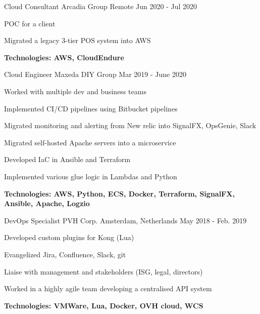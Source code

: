\begin{cventries}
\begin{minipage}{\dimexpr\textwidth-1cm}
\begin{cventrystack}
	\cventry
	{Cloud Consultant} %
	{Arcadia Group} %
	{Remote} %
	{Jun 2020 - Jul 2020} %
	{ %
		\begin{cvitems}
			\item {POC for a client}
			\item {Migrated a legacy 3-tier POS system into AWS}
			\item {\bfseries{Technologies:} AWS, CloudEndure}
		\end{cvitems}
	}

	\cventry
	{Cloud Engineer} %
	{Maxeda DIY Group} %
	{} %
	{Mar 2019 - June 2020} %
	{ %
		\begin{cvitems}
			\item {Worked with multiple dev and business teams}
			\item {Implemented CI/CD pipelines using Bitbucket pipelines}
			\item {Migrated monitoring and alerting from New relic into SignalFX, OpsGenie, Slack}
			\item {Migrated self-hosted Apache servers into a microservice}
			\item {Developed IaC in Ansible and Terraform}
			\item {Implemented various glue logic in Lambdas and Python}
			\item {\bfseries{Technologies:} AWS, Python, ECS, Docker, Terraform, SignalFX, Ansible, Apache, Logzio}
		\end{cvitems}
	}

\end{cventrystack}
\end{minipage}


\cventry
{DevOps Specialist} %
{PVH Corp.} %
{Amsterdam, Netherlands} %
{May 2018 - Feb. 2019} %
{ %
	\begin{cvitems}
	\item {Developed custom plugins for Kong (Lua)}
		\item {Evangelized Jira, Confluence, Slack, git}
		\item {Liaise with management and stakeholders (ISG, legal, directors)}
		\item {Worked in a highly agile team developing a centralised API system}
		\item {\bfseries{Technologies:} VMWare, Lua, Docker, OVH cloud, WCS}
	\end{cvitems}
}


\end{cventries}
